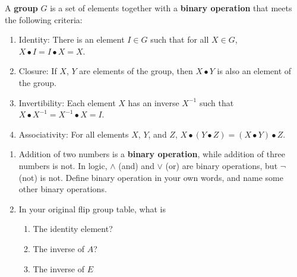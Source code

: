 \documentclass[../gatm.tex]{subfiles}
\begin{document}
A \textbf{group} $G$ is a set of elements together with a \textbf{binary operation} that meets the following criteria:
\begin{enumerate}[label=(\alph*)]
\item Identity: There is an element $I\in G$ such that for all $X\in G$, $X\bullet I = I\bullet X = X$.
\item Closure: If $X$, $Y$ are elements of the group, then $X\bullet Y$ is also an element of the group.
\item Invertibility: Each element $X$ has an inverse $X^{-1}$ such that $X\bullet X^{-1} = X^{-1}\bullet X = I$.
\item Associativity: For all elements $X$, $Y$, and $Z$, $X\bullet (Y\bullet Z) = (X\bullet Y) \bullet Z$.
\end{enumerate}
\begin{enumerate}
\setcounter{enumi}{\theenumLast}
\item Addition of two numbers is a \textbf{binary operation}, while addition of three numbers is not. In logic, $\land$ (and) and $\lor$ (or) are binary operations, but $\lnot$ (not) is not. Define binary operation in your own words, and name some other binary operations.
\item In your original flip group table, what is
\begin{enumerate}
\item The identity element?
\item The inverse of $A$?
\item The inverse of $E$
\end{enumerate}
\end{enumerate}
\end{document}
